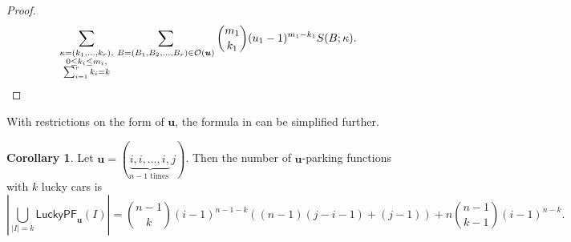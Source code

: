 \documentclass[reqno]{amsart}
\newcommand{\LPF}{\mathsf{LuckyPF}}
\theoremstyle{definition}
\newtheorem{corollary}{Corollary}[theorem]
\theoremstyle{remark}
\newcommand{\out}{\mathcal{O}}
\newcommand{\bsy}{\boldsymbol}
\begin{document}
\begin{proof}
\[
\sum_{\substack{\kappa = (k_1,\ldots, k_r),\\0\leq k_i\leq m_i,\\\sum_{i=1}^{r}k_i=k}}
\,\sum_{{B = (B_1,B_2,\ldots, B_r) \in \out(\bsy u)}}\binom{m_1}{k_1}(u_1-1)^{m_1-k_1} S(B ; \kappa). \qedhere
\]
\end{proof}


With restrictions on the form of $\bsy{u}$, the formula in  can be simplified further.

\begin{corollary}
Let
$\bsy{u}=(\underbrace{i,i,\ldots, i,}_{n-1 \text{ times }} j)$. Then the number of $\bsy{u}$-parking functions with $k$ lucky cars is
\[ 
\left|\bigcup_{|I|=k} \LPF_{\bsy{u}}(I)\right| = \binom{n-1}{k}(i-1)^{n-1-k} \left((n-1)  (j-i-1)+ (j-1) \right)+n\binom{n-1}{k-1}(i-1)^{n-k}.
\]
\end{corollary}
\end{document}
